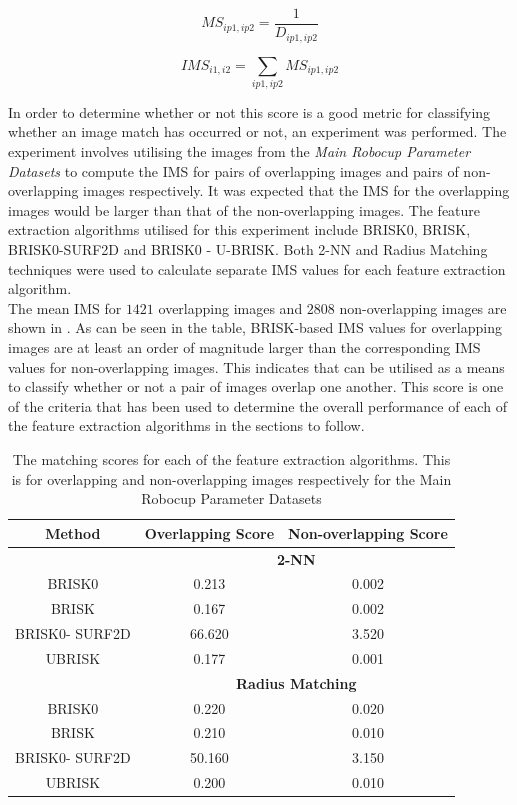 \begin{equation}
MS_{ip1, ip2} = \frac{1}{D_{ip1, ip2}}
\label{eqn:inverseDistance}
\end{equation}

\begin{equation}
IMS_{i1, i2} = \sum_{ip1, ip2} MS_{ip1, ip2}
\label{eqn:ims}
\end{equation}

In order to determine whether or not this score is a good metric for classifying whether an image match has occurred or not, an experiment was performed. The experiment involves utilising the images from the \textit{Main Robocup Parameter Datasets} to compute the IMS for pairs of overlapping images and pairs of non-overlapping images respectively. It was expected that the IMS for the overlapping images would be larger than that of the non-overlapping images. The feature extraction algorithms utilised for this experiment include BRISK0, BRISK, BRISK0-SURF2D and BRISK0 - U-BRISK. Both 2-NN and Radius Matching techniques were used to calculate separate IMS values for each feature extraction algorithm.\\

The mean IMS for $1421$ overlapping images and $2808$ non-overlapping images are shown in . As can be seen in the table, BRISK-based IMS values for overlapping images are at least an order of magnitude larger than the corresponding IMS values for non-overlapping images. This indicates that  can be utilised as a means to classify whether or not a pair of images overlap one another. This score is one of the criteria that has been used to determine the overall performance of each of the feature extraction algorithms in the sections to follow.\\

\begin{table}
\centering
\caption{The matching scores for each of the feature extraction algorithms. This is for overlapping and non-overlapping images respectively for the Main Robocup Parameter Datasets}
\begin{tabular}{|c|c|c|}
\hline 
\textbf{Method} & \textbf{Overlapping Score} & \textbf{Non-overlapping Score}\tabularnewline
\hline 
\hline 
 & \multicolumn{2}{c|}{\textbf{2-NN}}\tabularnewline
\hline 
BRISK0 & 0.213 & 0.002\tabularnewline
\hline 
BRISK & 0.167 & 0.002\tabularnewline
\hline 
BRISK0- SURF2D & 66.620 & 3.520\tabularnewline
\hline 
UBRISK & 0.177 & 0.001\tabularnewline
\hline 
 & \multicolumn{2}{c|}{\textbf{Radius Matching}}\tabularnewline
\hline 
BRISK0 & 0.220 & 0.020\tabularnewline
\hline 
BRISK & 0.210 & 0.010\tabularnewline
\hline 
BRISK0- SURF2D & 50.160 & 3.150\tabularnewline
\hline 
UBRISK & 0.200 & 0.010\tabularnewline
\hline 
\end{tabular}
\label{tab:matchingScoreCompare}
\end{table}

